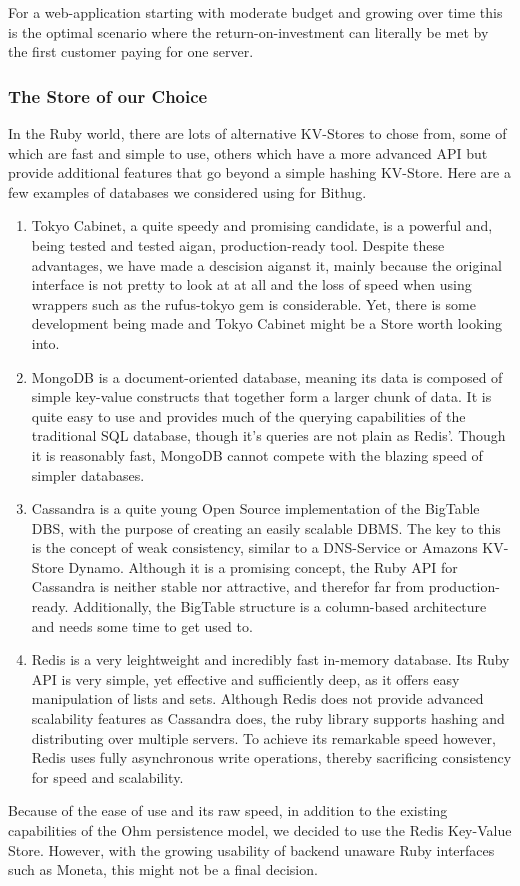 For a web-application starting with
moderate budget and growing over time this is the optimal scenario where the 
return-on-investment can literally be met by the first customer paying for one 
server.

\subsubsection{The Store of our Choice}
In the Ruby world, there are lots of alternative KV-Stores to chose from, some of which 
are fast and simple to use, others which have a more advanced API but provide 
additional features that go beyond a simple hashing KV-Store. Here are a few 
examples of databases we considered using for Bithug.
\begin{enumerate}
  \item
    Tokyo Cabinet, a quite speedy and promising candidate, is a powerful 
    and, being tested and tested aigan, production-ready\cite{cite mixi} tool. 
    Despite these advantages, we have made a descision aiganst it, mainly because 
    the original interface is not pretty to look at at all and the loss of speed when 
    using wrappers such as the rufus-tokyo gem is considerable. Yet, there is some 
    development being made and Tokyo Cabinet might be a Store worth looking into.
  \item
    MongoDB is a document-oriented database, meaning its data is composed of simple 
    key-value constructs that together form a larger chunk of data. It is quite 
    easy to use and provides much of the querying capabilities of the traditional 
    SQL database, though it's queries are not plain as Redis'. Though it is 
    reasonably fast, MongoDB cannot compete with the blazing speed of simpler 
    databases.
  \item
    Cassandra is a quite young Open Source implementation of the BigTable DBS, \cite{chang2006bigtable}
    with the purpose of creating an easily scalable DBMS. The key to this is 
    the concept of weak consistency, similar to a DNS-Service or 
    Amazons KV-Store Dynamo. \cite{decandia2007dynamo}
    Although it is a promising concept, the Ruby API for Cassandra is neither stable 
    nor attractive, and therefor far from production-ready. Additionally, the 
    BigTable structure is a column-based architecture and needs some time to get 
    used to.
  \item
    Redis is a very leightweight and incredibly fast \cite{haines2009redis} 
    in-memory database. Its Ruby API is very simple, yet effective and 
    sufficiently deep, as it offers easy manipulation of lists and sets. 
    Although Redis does not provide advanced scalability features as Cassandra 
    does, the ruby library supports hashing and distributing over multiple 
    servers. To achieve its remarkable speed however, Redis uses fully 
    asynchronous write operations, thereby sacrificing consistency for speed 
    and scalability.
\end{enumerate}

Because of the ease of use and its raw speed, in addition to the existing 
capabilities of the Ohm persistence model, we decided to use the Redis 
Key-Value Store. However, with the growing usability of backend unaware Ruby 
interfaces such as Moneta, this might not be a final decision.
